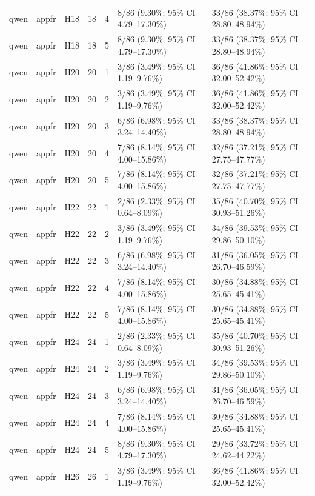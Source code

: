 \begin{longtable}{lllrrll}
qwen & appfr & H18 & 18 & 4 & 8/86 (9.30\%; 95\% CI 4.79–17.30\%) & 33/86 (38.37\%; 95\% CI 28.80–48.94\%) \\
qwen & appfr & H18 & 18 & 5 & 8/86 (9.30\%; 95\% CI 4.79–17.30\%) & 33/86 (38.37\%; 95\% CI 28.80–48.94\%) \\
qwen & appfr & H20 & 20 & 1 & 3/86 (3.49\%; 95\% CI 1.19–9.76\%) & 36/86 (41.86\%; 95\% CI 32.00–52.42\%) \\
qwen & appfr & H20 & 20 & 2 & 3/86 (3.49\%; 95\% CI 1.19–9.76\%) & 36/86 (41.86\%; 95\% CI 32.00–52.42\%) \\
qwen & appfr & H20 & 20 & 3 & 6/86 (6.98\%; 95\% CI 3.24–14.40\%) & 33/86 (38.37\%; 95\% CI 28.80–48.94\%) \\
qwen & appfr & H20 & 20 & 4 & 7/86 (8.14\%; 95\% CI 4.00–15.86\%) & 32/86 (37.21\%; 95\% CI 27.75–47.77\%) \\
qwen & appfr & H20 & 20 & 5 & 7/86 (8.14\%; 95\% CI 4.00–15.86\%) & 32/86 (37.21\%; 95\% CI 27.75–47.77\%) \\
qwen & appfr & H22 & 22 & 1 & 2/86 (2.33\%; 95\% CI 0.64–8.09\%) & 35/86 (40.70\%; 95\% CI 30.93–51.26\%) \\
qwen & appfr & H22 & 22 & 2 & 3/86 (3.49\%; 95\% CI 1.19–9.76\%) & 34/86 (39.53\%; 95\% CI 29.86–50.10\%) \\
qwen & appfr & H22 & 22 & 3 & 6/86 (6.98\%; 95\% CI 3.24–14.40\%) & 31/86 (36.05\%; 95\% CI 26.70–46.59\%) \\
qwen & appfr & H22 & 22 & 4 & 7/86 (8.14\%; 95\% CI 4.00–15.86\%) & 30/86 (34.88\%; 95\% CI 25.65–45.41\%) \\
qwen & appfr & H22 & 22 & 5 & 7/86 (8.14\%; 95\% CI 4.00–15.86\%) & 30/86 (34.88\%; 95\% CI 25.65–45.41\%) \\
qwen & appfr & H24 & 24 & 1 & 2/86 (2.33\%; 95\% CI 0.64–8.09\%) & 35/86 (40.70\%; 95\% CI 30.93–51.26\%) \\
qwen & appfr & H24 & 24 & 2 & 3/86 (3.49\%; 95\% CI 1.19–9.76\%) & 34/86 (39.53\%; 95\% CI 29.86–50.10\%) \\
qwen & appfr & H24 & 24 & 3 & 6/86 (6.98\%; 95\% CI 3.24–14.40\%) & 31/86 (36.05\%; 95\% CI 26.70–46.59\%) \\
qwen & appfr & H24 & 24 & 4 & 7/86 (8.14\%; 95\% CI 4.00–15.86\%) & 30/86 (34.88\%; 95\% CI 25.65–45.41\%) \\
qwen & appfr & H24 & 24 & 5 & 8/86 (9.30\%; 95\% CI 4.79–17.30\%) & 29/86 (33.72\%; 95\% CI 24.62–44.22\%) \\
qwen & appfr & H26 & 26 & 1 & 3/86 (3.49\%; 95\% CI 1.19–9.76\%) & 36/86 (41.86\%; 95\% CI 32.00–52.42\%) \\

\end{longtable}
